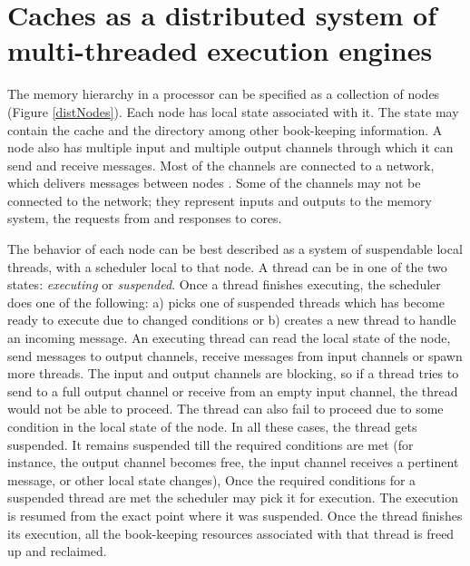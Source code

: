 \section{Caches as a distributed system of multi-threaded execution engines}
\label{sec:threads}

The memory hierarchy in a processor can be specified as a collection of nodes
(Figure \ref{distNodes}). Each node has local state associated with it. The
state may contain the cache and the directory among other book-keeping
information. A node also has multiple input and multiple output channels
through which it can send and receive messages. Most of the channels are
connected to a network, which delivers messages between nodes
. Some of the channels may not be connected to the network; they represent
inputs and outputs to the memory system, \viz the requests from and responses to
cores.

The behavior of each node can be best described as a system of suspendable local
threads, with a scheduler local to that node.  A thread can be in one of the two
states: \emph{executing} or \emph{suspended}. Once a thread finishes executing,
the scheduler does one of the following: a) picks one of suspended threads which
has become ready to execute due to changed conditions or b) creates a new thread
to handle an incoming message. An executing thread can read the local state
of the node, send messages to output channels, receive messages from input
channels or spawn more threads. The input and output channels are blocking, so
if a thread tries to send to a full output channel or receive from an empty
input channel, the thread would not be able to proceed. The thread can also
fail to proceed due to some condition in the local state of the node. In
all these cases, the thread gets suspended. It remains suspended till the
required conditions are met (for instance, the output channel becomes free, the
input channel receives a pertinent message, or other local state changes),
Once the required conditions for a suspended thread are met the scheduler may
pick it for execution. The execution is resumed from the exact point where it
was suspended. Once the thread finishes its execution, all the book-keeping
resources associated with that thread is freed up and reclaimed.

